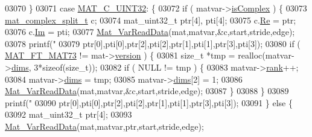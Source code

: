 \begin{DoxyCode}
{{{{{{{{{{{{{{{{{{{{{{{{{{{{{{{{{{{{{{{{03070                 \}
03071                 \textcolor{keywordflow}{case} \hyperlink{group___m_a_t_ggad4d60ae7b709fc81bfd744fb4c857c40a9a17a7edd45b19ef68197db81b27e816}{MAT\_C\_UINT32}: \{
03072                     \textcolor{keywordflow}{if} ( matvar->\hyperlink{group___m_a_t_aeb03b3a69f108dc05470b00443a43739}{isComplex} ) \{
03073                         \hyperlink{group___m_a_t_structmat__complex__split__t}{mat\_complex\_split\_t} c;
03074                         mat\_uint32\_t ptr[4], pti[4];
03075                         c.\hyperlink{group___m_a_t_a484a93607508adac2bce53a0252e0325}{Re} = ptr;
03076                         c.\hyperlink{group___m_a_t_a7182d10b0d3598415887376065440946}{Im} = pti;
03077                         \hyperlink{group___m_a_t_ga1845000f4fc6252ec5ff11c4b9f0759f}{Mat\_VarReadData}(mat,matvar,&c,start,stride,edge);
03078                         printf(\textcolor{stringliteral}{"%
03079                             ptr[0],pti[0],ptr[2],pti[2],ptr[1],pti[1],ptr[3],pti[3]);
03080                         \textcolor{keywordflow}{if} ( \hyperlink{group___m_a_t_ggad03442b8378999189d510e3745c702b7a765c5d1d5038947646260dc82483517e}{MAT\_FT\_MAT73} != mat->\hyperlink{struct__mat__t_a729c2bc0afc97485057a5af425635b1a}{version} ) \{
03081                             \textcolor{keywordtype}{size\_t} *tmp = realloc(matvar->\hyperlink{group___m_a_t_a8e01234e1c862ce3472bb37f5a09b92c}{dims}, 3*\textcolor{keyword}{sizeof}(\textcolor{keywordtype}{size\_t}));
03082                             \textcolor{keywordflow}{if} ( NULL != tmp ) \{
03083                                 matvar->\hyperlink{group___m_a_t_a84ba70c96ded13cc555fa75b768d9921}{rank}++;
03084                                 matvar->\hyperlink{group___m_a_t_a8e01234e1c862ce3472bb37f5a09b92c}{dims} = tmp;
03085                                 matvar->\hyperlink{group___m_a_t_a8e01234e1c862ce3472bb37f5a09b92c}{dims}[2] = 1;
03086                                 \hyperlink{group___m_a_t_ga1845000f4fc6252ec5ff11c4b9f0759f}{Mat\_VarReadData}(mat,matvar,&c,start,stride,edge);
03087                             \}
03088                         \}
03089                         printf(\textcolor{stringliteral}{"%
03090                             ptr[0],pti[0],ptr[2],pti[2],ptr[1],pti[1],ptr[3],pti[3]);
03091                     \} \textcolor{keywordflow}{else} \{
03092                         mat\_uint32\_t ptr[4];
03093                         \hyperlink{group___m_a_t_ga1845000f4fc6252ec5ff11c4b9f0759f}{Mat\_VarReadData}(mat,matvar,ptr,start,stride,edge);
}}}}}}}}}}}}}}}}}}}}}}}}}}}}}}}}}}}}}}}}}}
\end{DoxyCode}
